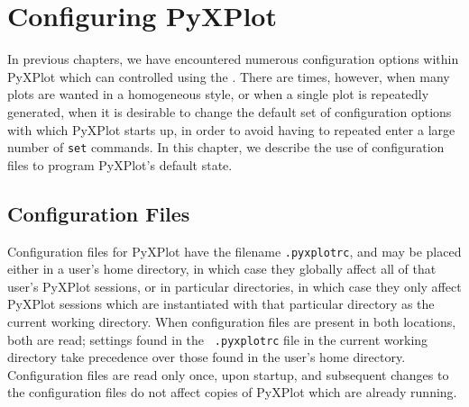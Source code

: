 %
%
%
%
%



\chapter{Configuring PyXPlot}
\label{ch:configuration}

In previous chapters, we have encountered numerous configuration options within
PyXPlot which can controlled using the . There are times, however,
when many plots are wanted in a homogeneous style, or when a single plot is
repeatedly generated, when it is desirable to change the default set of
configuration options with which PyXPlot starts up, in order to avoid having to
repeated enter a large number of {\tt set} commands. In this chapter, we
describe the use of configuration files to program PyXPlot's default state.

\section{Configuration Files}

Configuration files for PyXPlot have the filename {\tt .pyxplotrc}, and may be
placed either in a user's home directory, in which case they globally affect
all of that user's PyXPlot sessions, or in particular directories, in which
case they only affect PyXPlot sessions which are instantiated with that
particular directory as the current working directory.  When configuration
files are present in both locations, both are read; settings found in the {\tt
.pyxplotrc} file in the current working directory take precedence over those
found in the user's home directory. Configuration files are read only once,
upon startup, and subsequent changes to the configuration files do not affect
copies of PyXPlot which are already running.

